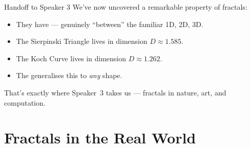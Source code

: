 \begin{frame}[shrink]{Handoff to Speaker 3}
  \small
  We've now uncovered a remarkable property of fractals:

  \begin{itemize}
    \item They have  ---
      genuinely ``between'' the familiar 1D, 2D, 3D.
    \item The Sierpinski Triangle lives in dimension
      $D\approx 1.585$.
    \item The Koch Curve lives in dimension
      $D\approx 1.262$.
    \item The  generalises
      this to \emph{any} shape.
  \end{itemize}

  \pause
  \vspace{0.3cm}
  \begin{center}
  \end{center}

  \vspace{0.05cm}
  \pause
  That's exactly where Speaker~3 takes us ---
  fractals in nature, art, and computation.
\end{frame}

\section{Fractals in the Real World}

